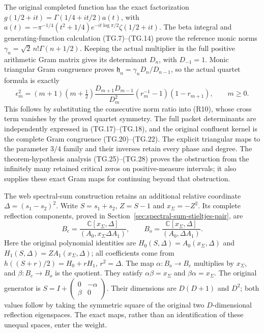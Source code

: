 The original completed function has the exact factorization
\(g(1/2+it)=\Gamma(1/4+it/2)a(t)\), with
\(a(t)=-\pi^{-1/4}(t^2+1/4)e^{-it\log\pi/2}\zeta(1/2+it)\).
The beta integral and generating-function calculation (TG.7)--(TG.14)
prove the reference monic norms
\(\gamma_n=\sqrt2\,n!\Gamma(n+1/2)\). Keeping the actual
multiplier in the full positive arithmetic Gram matrix gives its
determinant \(D_n\), with \(D_{-1}=1\). Monic triangular Gram
congruence proves \(\mathfrak h_n=\gamma_nD_n/D_{n-1}\), so
the actual quartet formula is exactly
\[
 \boxed{\epsilon_m^2=(m+1)(m+\tfrac12)
        \frac{D_{m+1}D_{m-1}}{D_m^2}
                  (r_m^{-1}-1)(1-r_{m+1}),\qquad m\ge0.}
 \tag{R17}
\]
This follows by substituting the consecutive norm ratio into
(R10), whose cross term vanishes by the proved quartet symmetry.
The full packet determinants are independently expressed in
(TG.17)--(TG.18), and the original confluent kernel is the complete
Gram congruence (TG.20)--(TG.22). The explicit triangular maps to
the parameter \(3/4\) family and their inverses retain every phase
and degree. The theorem-hypothesis analysis (TG.25)--(TG.28)
proves the obstruction from the infinitely many retained critical
zeros on positive-measure intervals; it also supplies these exact
Gram maps for continuing beyond that obstruction.

The web spectral-sum construction retains an additional relative
coordinate \(\Delta=(s_1-s_2)^2\). Write \(S=s_1+s_2\),
\(Z=S-1\) and \(x_\Sigma=-Z^2\). Its complete reflection
components, proved in Section~\ref{sec:spectral-sum-stieltjes-pair}, are
\[
 B_e=\frac{\mathbb C[x_\Sigma,\Delta]}{(A_0,x_\Sigma\Delta A_1)},
 \qquad
 B_o=\frac{\mathbb C[x_\Sigma,\Delta]}{(A_0,\Delta A_1)}.
 \tag{R18}
\]
Here the original polynomial identities are
\(H_0(S,\Delta)=A_0(x_\Sigma,\Delta)\) and
\(H_1(S,\Delta)=Z A_1(x_\Sigma,\Delta)\); all coefficients
come from \(h((S+r)/2)=H_0+rH_1\), \(r^2=\Delta\).
The map \(\alpha:B_o\to B_e\) multiplies by \(x_\Sigma\),
and \(\beta:B_e\to B_o\) is the quotient. They satisfy
\(\alpha\beta=x_\Sigma\) and \(\beta\alpha=x_\Sigma\).
The original generator is
\(S=I+\left(\begin{smallmatrix}0&-\alpha\\\beta&0\end{smallmatrix}\right)\).
Their dimensions are \(D(D+1)\) and \(D^2\); both values follow
by taking the symmetric square of the original two
\(D\)-dimensional reflection eigenspaces. The exact maps, rather
than an identification of these unequal spaces, enter the weight.

